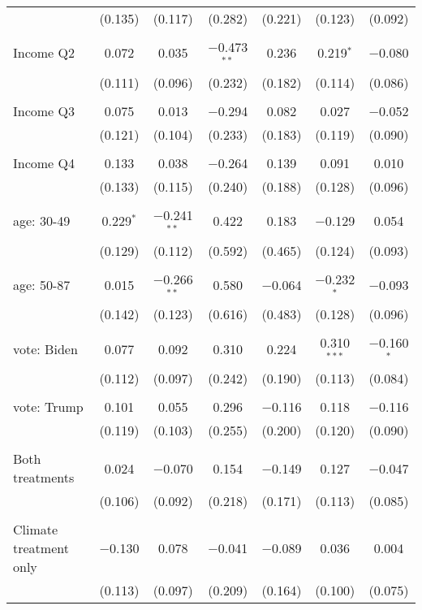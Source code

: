 \begin{tabular}{@{\extracolsep{5pt}}lcccccc}
  & (0.135) & (0.117) & (0.282) & (0.221) & (0.123) & (0.092) \\ 
  & & & & & & \\ 
 Income Q2 & 0.072 & 0.035 & $-$0.473$^{**}$ & 0.236 & 0.219$^{*}$ & $-$0.080 \\ 
  & (0.111) & (0.096) & (0.232) & (0.182) & (0.114) & (0.086) \\ 
  & & & & & & \\ 
 Income Q3 & 0.075 & 0.013 & $-$0.294 & 0.082 & 0.027 & $-$0.052 \\ 
  & (0.121) & (0.104) & (0.233) & (0.183) & (0.119) & (0.090) \\ 
  & & & & & & \\ 
 Income Q4 & 0.133 & 0.038 & $-$0.264 & 0.139 & 0.091 & 0.010 \\ 
  & (0.133) & (0.115) & (0.240) & (0.188) & (0.128) & (0.096) \\ 
  & & & & & & \\ 
 age: 30-49 & 0.229$^{*}$ & $-$0.241$^{**}$ & 0.422 & 0.183 & $-$0.129 & 0.054 \\ 
  & (0.129) & (0.112) & (0.592) & (0.465) & (0.124) & (0.093) \\ 
  & & & & & & \\ 
 age: 50-87 & 0.015 & $-$0.266$^{**}$ & 0.580 & $-$0.064 & $-$0.232$^{*}$ & $-$0.093 \\ 
  & (0.142) & (0.123) & (0.616) & (0.483) & (0.128) & (0.096) \\ 
  & & & & & & \\ 
 vote: Biden & 0.077 & 0.092 & 0.310 & 0.224 & 0.310$^{***}$ & $-$0.160$^{*}$ \\ 
  & (0.112) & (0.097) & (0.242) & (0.190) & (0.113) & (0.084) \\ 
  & & & & & & \\ 
 vote: Trump & 0.101 & 0.055 & 0.296 & $-$0.116 & 0.118 & $-$0.116 \\ 
  & (0.119) & (0.103) & (0.255) & (0.200) & (0.120) & (0.090) \\ 
  & & & & & & \\ 
 Both treatments & 0.024 & $-$0.070 & 0.154 & $-$0.149 & 0.127 & $-$0.047 \\ 
  & (0.106) & (0.092) & (0.218) & (0.171) & (0.113) & (0.085) \\ 
  & & & & & & \\ 
 Climate treatment only & $-$0.130 & 0.078 & $-$0.041 & $-$0.089 & 0.036 & 0.004 \\ 
  & (0.113) & (0.097) & (0.209) & (0.164) & (0.100) & (0.075) \\ 

\end{tabular}
